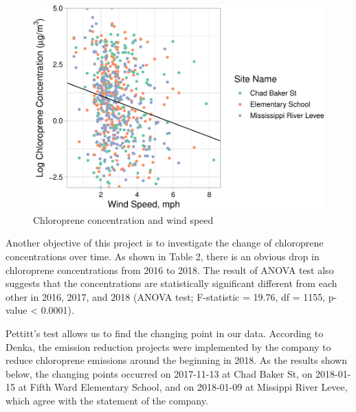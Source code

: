 \documentclass[12pt,]{article}
\newenvironment{Shaded}{\begin{snugshade}}{\end{snugshade}}
\newcommand{\KeywordTok}[1]{\textcolor[rgb]{0.13,0.29,0.53}{\textbf{#1}}}
\newcommand{\DataTypeTok}[1]{\textcolor[rgb]{0.13,0.29,0.53}{#1}}
\newcommand{\StringTok}[1]{\textcolor[rgb]{0.31,0.60,0.02}{#1}}
\newcommand{\CommentTok}[1]{\textcolor[rgb]{0.56,0.35,0.01}{\textit{#1}}}
\newcommand{\OperatorTok}[1]{\textcolor[rgb]{0.81,0.36,0.00}{\textbf{#1}}}
\newcommand{\NormalTok}[1]{#1}
\begin{document}
\begin{figure}
\centering
\includegraphics{Li_ENV872_Project_files/figure-latex/unnamed-chunk-7-1.pdf}
\caption{Chloroprene concentration and wind speed}
\end{figure}

Another objective of this project is to investigate the change of
chloroprene concentrations over time. As shown in Table 2, there is an
obvious drop in chloroprene concentrations from 2016 to 2018. The result
of ANOVA test also suggests that the concentrations are statistically
significant different from each other in 2016, 2017, and 2018 (ANOVA
test; F-statistic = 19.76, df = 1155, p-value \textless{} 0.0001).

Pettitt's test allows us to find the changing point in our data.
According to Denka, the emission reduction projects were implemented by
the company to reduce chloroprene emissions around the beginning in
2018. As the results shown below, the changing points occurred on
2017-11-13 at Chad Baker St, on 2018-01-15 at Fifth Ward Elementary
School, and on 2018-01-09 at Missippi River Levee, which agree with the
statement of the company.

\begin{Shaded}
\end{Shaded}
\end{document}
